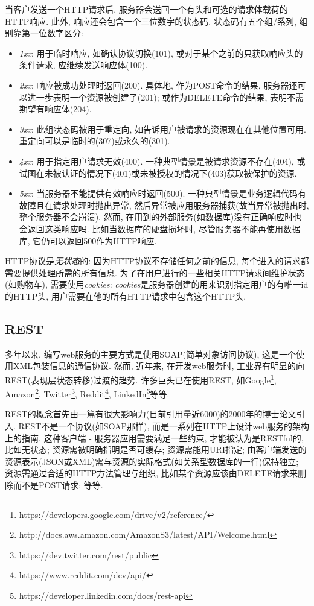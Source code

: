        当客户发送一个HTTP请求后, 服务器会送回一个有头和可选的请求体载荷的HTTP响应. 此外, 响应还会包含一个三位数字的状态码. 状态码有五个组/系列, 组别靠第一位数字区分: 
        \begin{itemize}
          \item \textit{1xx}: 用于临时响应, 如确认协议切换(101), 或对于某个之前的只获取响应头的条件请求, 应继续发送响应体(100). 
            \item \textit{2xx}: 响应被成功处理时返回(200). 具体地, 作为POST命令的结果, 服务器还可以进一步表明一个资源被创建了(201); 或作为DELETE命令的结果, 表明不需期望有响应体(204).
            \item \textit{3xx}: 此组状态码被用于重定向, 如告诉用户被请求的资源现在在其他位置可用. 重定向可以是临时的(307)或永久的(301). 
            \item \textit{4xx}: 用于指定用户请求无效(400). 一种典型情景是被请求资源不存在(404), 或试图在未被认证的情况下(401)或未被授权的情况下(403)获取被保护的资源. 
            \item \textit{5xx}: 当服务器不能提供有效响应时返回(500). 一种典型情景是业务逻辑代码有故障且在请求处理时抛出异常, 然后异常被应用服务器捕获(故当异常被抛出时, 整个服务器不会崩溃). 然而, 在用到的外部服务(如数据库)没有正确响应时也会返回这类响应吗. 比如当数据库的硬盘损坏时, 尽管服务器不能再使用数据库, 它仍可以返回500作为HTTP响应.
        \end{itemize}
    
      HTTP协议是\textit{无状态}的: 因为HTTP协议不存储任何之前的信息, 每个进入的请求都需要提供处理所需的所有信息. 为了在用户进行的一些相关HTTP请求间维护状态(如购物车), 需要使用\textit{cookies}: \textit{cookies}是服务器创建的用来识别指定用户的有唯一id的HTTP头, 用户需要在他的所有HTTP请求中包含这个HTTP头.
    
    \subsection{REST}
      多年以来, 编写web服务的主要方式是使用SOAP(简单对象访问协议), 这是一个使用XML包装信息的通信协议. 然而, 近年来, 在开发web服务时, 工业界有明显的向REST(表现层状态转移)过渡的趋势. 许多巨头已在使用REST, 如Google\footnote{https://developers.google.com/drive/v2/reference/}, Amazon\footnote{ http://docs.aws.amazon.com/AmazonS3/latest/API/Welcome.html}, Twitter\footnote{https://dev.twitter.com/rest/public}, Reddit\footnote{https://www.reddit.com/dev/api/}, LinkedIn\footnote{https://developer.linkedin.com/docs/rest-api}等等. 

    REST的概念首先由一篇有很大影响力(目前引用量近6000)的2000年的博士论文\cite{fielding2000architectural}引入. REST不是一个协议(如SOAP那样), 而是一系列在HTTP上设计web服务的架构上的指南. 这种客户端 - 服务器应用需要满足一些约束, 才能被认为是RESTful的, 比如无状态; 资源需被明确指明是否可缓存; 资源需能用URI指定; 由客户端发送的资源表示(JSON或XML)需与资源的实际格式(如关系型数据库的一行)保持独立; 资源需通过合适的HTTP方法管理与组织, 比如某个资源应该由DELETE请求来删除而不是POST请求; 等等.
        
